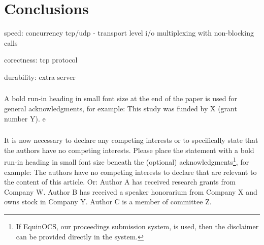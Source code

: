 \documentclass[runningheads]{llncs}
\begin{document}

\section{Conclusions}

speed:
concurrency
tcp/udp - transport level
i/o multiplexing with non-blocking calls

corectness:
tcp protocol

durability:
extra server

\begin{credits}
    \subsubsection{\ackname} A bold run-in heading in small font size at the end of the paper is
    used for general acknowledgments, for example: This study was funded
    by X (grant number Y).
    e
    \subsubsection{\discintname}
    It is now necessary to declare any competing interests or to specifically
    state that the authors have no competing interests. Please place the
    statement with a bold run-in heading in small font size beneath the
    (optional) acknowledgments\footnote{If EquinOCS, our proceedings submission
    system, is used, then the disclaimer can be provided directly in the system.},
    for example: The authors have no competing interests to declare that are
    relevant to the content of this article. Or: Author A has received research
    grants from Company W. Author B has received a speaker honorarium from
    Company X and owns stock in Company Y. Author C is a member of committee Z.
    \end{credits}
    

\end{document}
